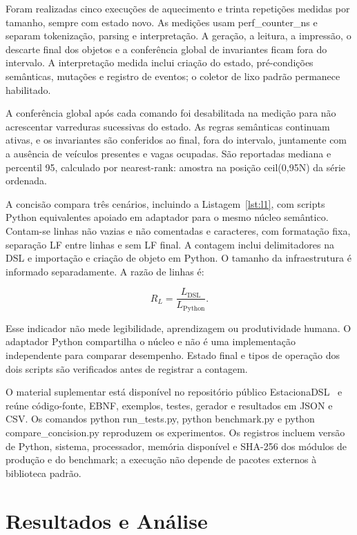 \documentclass[conference,a4paper]{IEEEtran}
\begin{document}
Foram realizadas cinco execuções de aquecimento e trinta repetições medidas por tamanho, sempre com estado novo. As medições usam perf\_counter\_ns e separam tokenização, parsing e interpretação. A geração, a leitura, a impressão, o descarte final dos objetos e a conferência global de invariantes ficam fora do intervalo. A interpretação medida inclui criação do estado, pré-condições semânticas, mutações e registro de eventos; o coletor de lixo padrão permanece habilitado.


A conferência global após cada comando foi desabilitada na medição para não acrescentar varreduras sucessivas do estado. As regras semânticas continuam ativas, e os invariantes são conferidos ao final, fora do intervalo, juntamente com a ausência de veículos presentes e vagas ocupadas. São reportadas mediana e percentil 95, calculado por nearest-rank: amostra na posição ceil(0,95N) da série ordenada.


A concisão compara três cenários, incluindo a Listagem~\ref{lst:l1}, com scripts Python equivalentes apoiado em adaptador para o mesmo núcleo semântico. Contam-se linhas não vazias e não comentadas e caracteres, com formatação fixa, separação LF entre linhas e sem LF final. A contagem inclui delimitadores na DSL e importação e criação de objeto em Python. O tamanho da infraestrutura é informado separadamente. A razão de linhas é:


\begin{equation}R_L=\frac{L_{\mathrm{DSL}}}{L_{\mathrm{Python}}}.\label{eq:conc}\end{equation}

Esse indicador não mede legibilidade, aprendizagem ou produtividade humana. O adaptador Python compartilha o núcleo e não é uma implementação independente para comparar desempenho. Estado final e tipos de operação dos dois scripts são verificados antes de registrar a contagem.


O material suplementar está disponível no repositório público EstacionaDSL~\cite{estacionadsl} e reúne código-fonte, EBNF, exemplos, testes, gerador e resultados em JSON e CSV. Os comandos python run\_tests.py, python benchmark.py e python compare\_concision.py reproduzem os experimentos. Os registros incluem versão de Python, sistema, processador, memória disponível e SHA-256 dos módulos de produção e do benchmark; a execução não depende de pacotes externos à biblioteca padrão.


\section{Resultados e Análise}
\end{document}

